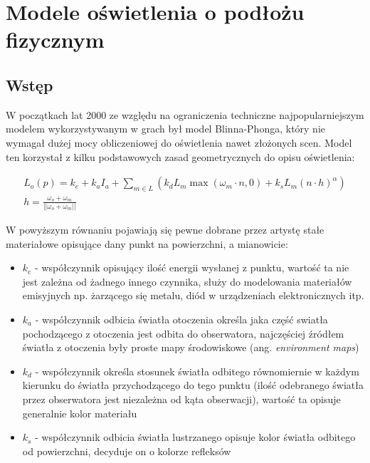 \documentclass[../main.tex]{subfiles}
\begin{document}
\chapter{Modele oświetlenia o podłożu fizycznym}

\section{Wstęp}

W początkach lat 2000 ze względu na ograniczenia techniczne najpopularniejszym
modelem wykorzystywanym w grach był model Blinna-Phonga, który nie wymagał
dużej mocy obliczeniowej do oświetlenia nawet złożonych scen. Model ten
korzystał z kilku podstawowych zasad geometrycznych do opisu oświetlenia:

\begin{gather*}
  L_o(p) = k_e + k_a I_a +
    \sum_{m \in L} \left( {
      k_d L_m \max\left({ \omega_m \cdot n, 0 }\right) +
      k_s L_m (n \cdot h)^{\alpha}
    } \right) \\
    h = \frac{\omega_o+\omega_m}{||\omega_o+\omega_m||}
\end{gather*}

W powyższym równaniu pojawiają się pewne dobrane przez artystę stałe materiałowe
opisujące dany punkt na powierzchni, a mianowicie:

\begin{itemize}

\item $k_e$ - współczynnik opisujący ilość energii wysłanej z punktu, wartość
  ta nie jest zależna od żadnego innego czynnika, służy do modelowania
  materiałów emisyjnych np. żarzącego się metalu, diód w urządzeniach
  elektronicznych itp.

\item $k_a$ - współczynnik odbicia światła otoczenia określa jaka część swiatła
  pochodzącego z otoczenia jest odbita do obserwatora, najczęściej źródłem
  światła z otoczenia były proste mapy środowiskowe (ang. \textit{environment
  maps})

\item $k_d$ - współczynnik określa stosunek światła odbitego równomiernie w
  każdym kierunku do światła przychodzącego do tego punktu (ilość odebranego
  światła przez obserwatora jest niezależna od kąta obserwacji), wartość ta
  opisuje generalnie kolor materiału

\item $k_s$ - współczynnik odbicia światła lustrzanego opisuje kolor światła
  odbitego od powierzchni, decyduje on o kolorze refleksów

\end{itemize}
\end{document}
